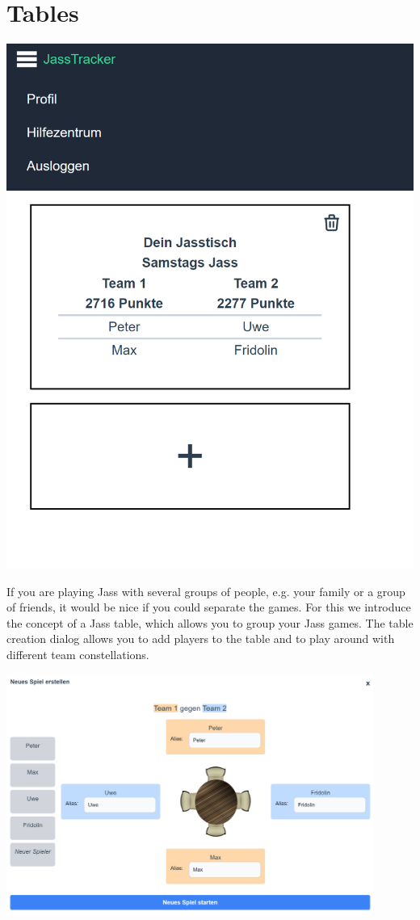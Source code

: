 \section*{Tables}
\includegraphics[height=0.5\textheight]{resources/screenshots/tables}

If you are playing Jass with several groups of people, e.g. your family or a group of friends, it would be nice if you could separate the games. For this we introduce the concept of a Jass table, which allows you to group your Jass games. The table creation dialog allows you to add players to the table and to play around with different team constellations.

\includegraphics[width=0.9\textwidth]{resources/screenshots/table-creation}

